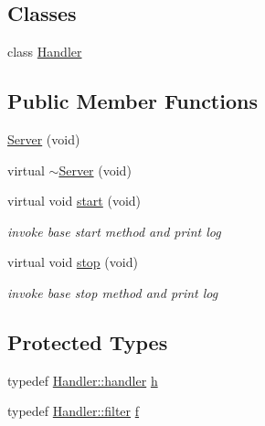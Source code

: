 \subsection*{Classes}
\begin{DoxyCompactItemize}
\item 
class \hyperlink{classxtd_1_1network_1_1http_1_1Server_1_1Handler}{Handler}
\end{DoxyCompactItemize}
\subsection*{Public Member Functions}
\begin{DoxyCompactItemize}
\item 
\hyperlink{classxtd_1_1network_1_1http_1_1Server_a8fb4b6d275b0bbbd0895e87a1f7beaa0}{Server} (void)
\item 
virtual \hyperlink{classxtd_1_1network_1_1http_1_1Server_a4aad3adc6af7be603a62778687c2f20b}{$\sim$\-Server} (void)
\item 
virtual void \hyperlink{classxtd_1_1network_1_1http_1_1Server_a5985de0bca1726c449f6bfd06b802070}{start} (void)
\begin{DoxyCompactList}\small\item\em invoke base start method and print log \end{DoxyCompactList}\item 
virtual void \hyperlink{classxtd_1_1network_1_1http_1_1Server_aead46dedab8830d3b7adff33d0ac548d}{stop} (void)
\begin{DoxyCompactList}\small\item\em invoke base stop method and print log \end{DoxyCompactList}\end{DoxyCompactItemize}
\subsection*{Protected Types}
\begin{DoxyCompactItemize}
\item 
typedef \hyperlink{structxtd_1_1network_1_1http_1_1Server_1_1Handler_1_1handler}{Handler\-::handler} \hyperlink{classxtd_1_1network_1_1http_1_1Server_adfa2951649119f630d33ce9083bd989c}{h}
\item 
typedef \hyperlink{structxtd_1_1network_1_1http_1_1Server_1_1Handler_1_1filter}{Handler\-::filter} \hyperlink{classxtd_1_1network_1_1http_1_1Server_a49f38021cb4d61f2c3027785f8fa561c}{f}
\end{DoxyCompactItemize}
